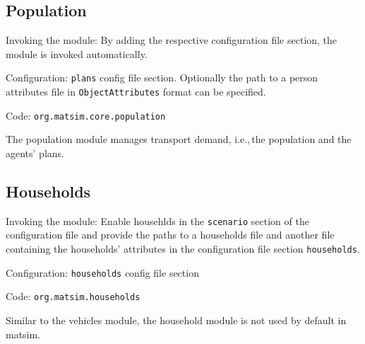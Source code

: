 
\subsection{Population}
\label{sec:population}
\begin{compactitem}
\item Invoking the module: By adding the respective configuration file section, the module is invoked automatically.
\item Configuration: \lstinline|plans| config file section. Optionally the path to a person attributes file in \lstinline|ObjectAttributes| format can be specified.
\item Code: \lstinline|org.matsim.core.population|
\end{compactitem}

The population module manages transport demand, i.e.,\,the population and the agents' plans.
\subsection{Households}
\label{sec:households}
\begin{compactitem}
\item Invoking the module: Enable househlds in the \lstinline|scenario| section of the configuration file and provide the paths to a households file and another file containing the households' attributes in the configuration file section \lstinline|households|.
\item Configuration: \lstinline|households| config file section
\item Code: \lstinline|org.matsim.households|
\end{compactitem}

Similar to the vehicles module, the household module is not used by default in \gls{matsim}.

